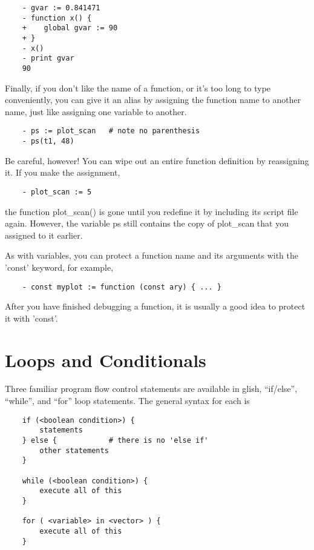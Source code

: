 \begin{verbatim}
	- gvar := 0.841471
	- function x() {
	+    global gvar := 90
	+ }
	- x()
	- print gvar
	90
\end{verbatim}

    Finally, if you don't like the name of a function, or it's too long to
type conveniently, you can give it an alias by assigning the function name
to another name, just like assigning one variable to another.

\begin{verbatim}
	- ps := plot_scan	# note no parenthesis
	- ps(t1, 48)
\end{verbatim}

Be careful, however!  You can wipe out an entire function definition by
reassigning it.  If you make the assignment,

\begin{verbatim}
	- plot_scan := 5
\end{verbatim}

the function plot\_scan() is gone until you redefine it by including its
script file again.  However, the variable ps still contains the copy
of plot\_scan that you assigned to it earlier.

As with variables, you can protect a function name and
its arguments with the 'const' keyword, for example,

\begin{verbatim}
	- const myplot := function (const ary) { ... }
\end{verbatim}

After you have finished debugging a function, it is usually a good idea to
protect it with 'const'.

\section{Loops and Conditionals}

    Three familiar program flow control statements are available in glish,
``if/else'', ``while'', and ``for'' loop statements.  The general syntax for each
is

\begin{verbatim}
	if (<boolean condition>) {
	    statements
	} else {			# there is no 'else if'
	    other statements
	}

	while (<boolean condition>) {
	    execute all of this
	}

	for ( <variable> in <vector> ) {
	    execute all of this
	}
\end{verbatim}

